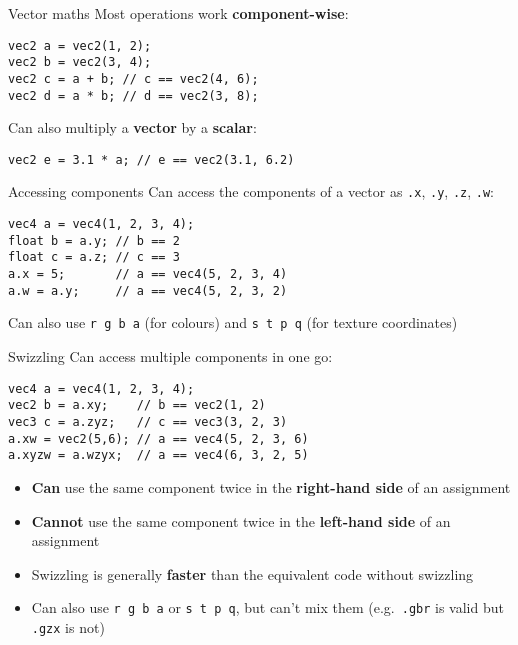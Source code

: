 \begin{frame}[fragile]{Vector maths}
	\pause Most operations work \textbf{component-wise}:
	\begin{lstlisting}
vec2 a = vec2(1, 2);
vec2 b = vec2(3, 4);
vec2 c = a + b; // c == vec2(4, 6);
vec2 d = a * b; // d == vec2(3, 8);
	\end{lstlisting}
	\pause Can also multiply a \textbf{vector} by a \textbf{scalar}:
	\begin{lstlisting}
vec2 e = 3.1 * a; // e == vec2(3.1, 6.2)
	\end{lstlisting}
\end{frame}

\begin{frame}[fragile]{Accessing components}
	\pause Can access the components of a vector as \lstinline{.x}, \lstinline{.y}, \lstinline{.z}, \lstinline{.w}:
	\pause\begin{lstlisting}
vec4 a = vec4(1, 2, 3, 4);
float b = a.y; // b == 2
float c = a.z; // c == 3
a.x = 5;       // a == vec4(5, 2, 3, 4)
a.w = a.y;     // a == vec4(5, 2, 3, 2)
	\end{lstlisting}
	\pause Can also use \lstinline{r g b a} (for colours) and \lstinline{s t p q} (for texture coordinates)
\end{frame}

\begin{frame}[fragile]{Swizzling}
	\pause Can access multiple components in one go:
	\pause\begin{lstlisting}
vec4 a = vec4(1, 2, 3, 4);
vec2 b = a.xy;    // b == vec2(1, 2)
vec3 c = a.zyz;   // c == vec3(3, 2, 3)
a.xw = vec2(5,6); // a == vec4(5, 2, 3, 6)
a.xyzw = a.wzyx;  // a == vec4(6, 3, 2, 5)
	\end{lstlisting}
	\begin{itemize}
		\pause \item\textbf{Can} use the same component twice in the \textbf{right-hand side} of an assignment 
		\pause \item\textbf{Cannot} use the same component twice in the \textbf{left-hand side} of an assignment 
		\pause \item Swizzling is generally \textbf{faster} than the equivalent code without swizzling
		\pause \item Can also use  \lstinline{r g b a} or \lstinline{s t p q}, but can't mix them
			(e.g.\ \lstinline{.gbr} is valid but \lstinline{.gzx} is not)
	\end{itemize}
\end{frame}
